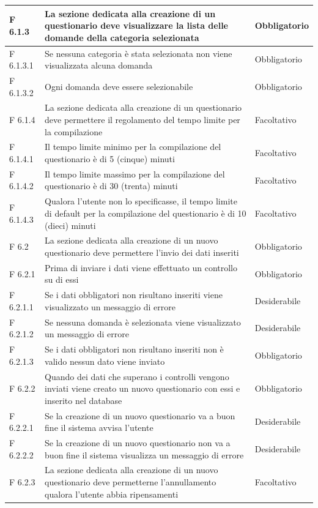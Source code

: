 \documentclass[a4paper,11pt]{article}
\begin{document}
\begin{longtable}{p{}p{}p{}}
F 6.1.3 & La sezione dedicata alla creazione di un questionario deve visualizzare la lista delle domande della categoria selezionata & Obbligatorio\\
\midrule
F 6.1.3.1 & Se nessuna categoria è stata selezionata non viene visualizzata alcuna domanda & Obbligatorio\\
\midrule
F 6.1.3.2 & Ogni domanda deve essere selezionabile & Obbligatorio\\
\midrule
F 6.1.4 & La sezione dedicata alla creazione di un questionario deve permettere il regolamento del tempo limite per la compilazione & Facoltativo\\
\midrule
F 6.1.4.1 & Il tempo limite minimo per la compilazione del questionario è di 5 (cinque) minuti & Facoltativo\\
\midrule
F 6.1.4.2 & Il tempo limite massimo per la compilazione del questionario è di 30 (trenta) minuti & Facoltativo\\
\midrule
F 6.1.4.3 & Qualora l'utente non lo specificasse, il tempo limite di default per la compilazione del questionario è di 10 (dieci) minuti & Facoltativo\\
\midrule
F 6.2 & La sezione dedicata alla creazione di un nuovo questionario deve permettere l'invio dei dati inseriti & Obbligatorio\\
\midrule
F 6.2.1 & Prima di inviare i dati viene effettuato un controllo su di essi & Obbligatorio\\
\midrule
F 6.2.1.1 & Se i dati obbligatori non risultano inseriti viene visualizzato un messaggio di errore & Desiderabile\\
\midrule
F 6.2.1.2 & Se nessuna domanda è selezionata viene visualizzato un messaggio di errore & Desiderabile\\
\midrule
F 6.2.1.3 & Se i dati obbligatori non risultano inseriti non è valido nessun dato viene inviato & Obbligatorio\\
\midrule
F 6.2.2 & Quando dei dati che superano i controlli vengono inviati viene creato un nuovo questionario con essi e inserito nel database & Obbligatorio\\
\midrule
F 6.2.2.1 & Se la creazione di un nuovo questionario va a buon fine il sistema avvisa l'utente & Desiderabile\\
\midrule
F 6.2.2.2 & Se la creazione di un nuovo questionario non va a buon fine il sistema visualizza un messaggio di errore & Desiderabile\\
\midrule
F 6.2.3 & La sezione dedicata alla creazione di un nuovo questionario deve permetterne l'annullamento qualora l'utente abbia ripensamenti & Facoltativo\\

\end{longtable}
\end{document}
